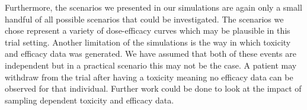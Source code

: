Furthermore, the scenarios we presented in our simulations are again only a small handful of all possible scenarios that could be investigated. The scenarios we chose represent a variety of dose-efficacy curves which may be plausible in this trial setting. Another limitation of the simulations is the way in which toxicity and efficacy data was generated. We have assumed that both of these events are independent but in a practical scenario this may not be the case. A patient may withdraw from the trial after having a toxicity meaning no efficacy data can be observed for that individual. Further work could be done to look at the impact of sampling dependent toxicity and efficacy data. 

